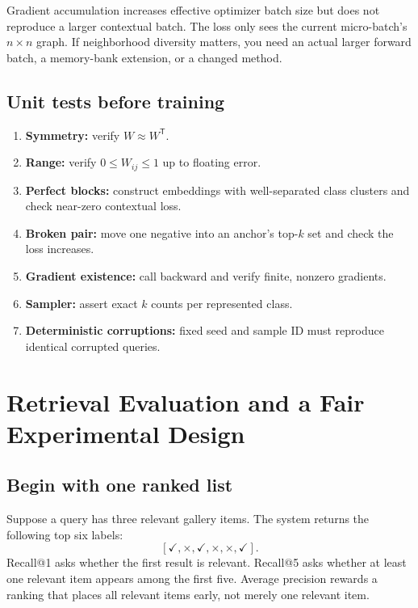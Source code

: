 \documentclass[11pt,oneside,openany]{book}
\theoremstyle{myplain}
\theoremstyle{definition}
\newcommand{\transpose}{\mathsf{T}}
\begin{document}
\begin{warningbox}[title=Important implementation trap]
Gradient accumulation increases effective optimizer batch size but does not reproduce a larger contextual batch. The loss only sees the current micro-batch's $n\times n$ graph. If neighborhood diversity matters, you need an actual larger forward batch, a memory-bank extension, or a changed method.
\end{warningbox}

\section{Unit tests before training}

\begin{enumerate}[leftmargin=*,itemsep=4pt]
  \item \textbf{Symmetry:} verify $W\approx W^\transpose$.
  \item \textbf{Range:} verify $0\le W_{ij}\le1$ up to floating error.
  \item \textbf{Perfect blocks:} construct embeddings with well-separated class clusters and check near-zero contextual loss.
  \item \textbf{Broken pair:} move one negative into an anchor's top-$k$ set and check the loss increases.
  \item \textbf{Gradient existence:} call backward and verify finite, nonzero gradients.
  \item \textbf{Sampler:} assert exact $k$ counts per represented class.
  \item \textbf{Deterministic corruptions:} fixed seed and sample ID must reproduce identical corrupted queries.
\end{enumerate}

\chapter{Retrieval Evaluation and a Fair Experimental Design}
\label{chap:evaluation}

\section{Begin with one ranked list}

Suppose a query has three relevant gallery items. The system returns the following top six labels:
\[
  [\checkmark,\times,\checkmark,\times,\times,\checkmark].
\]
Recall@1 asks whether the first result is relevant. Recall@5 asks whether at least one relevant item appears among the first five. Average precision rewards a ranking that places all relevant items early, not merely one relevant item.
\end{document}
